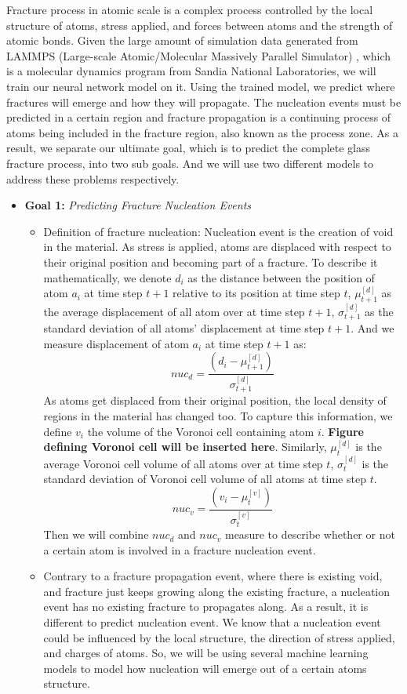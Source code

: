 
Fracture process in atomic scale is a complex process controlled by the local structure of atoms, stress applied, and forces between atoms and the strength of atomic bonds. 
Given the large amount of simulation data generated from LAMMPS (Large-scale Atomic/Molecular Massively Parallel Simulator) \cite{PAMD}, which is a molecular dynamics program from Sandia National Laboratories, we will train our neural network model on it. Using the trained model, we predict where fractures will emerge and how they will propagate. The nucleation events must be predicted in a certain region and fracture propagation is a continuing process of atoms being included in the fracture region, also known as the process zone. As a result, we separate our ultimate goal, which is to predict the complete glass fracture process, into two sub goals. And we will use two different models to address these problems respectively. 


\begin{itemize}
\item \textbf{Goal 1:} \emph{Predicting Fracture Nucleation Events} 
\begin{itemize} 
    \item Definition of fracture nucleation: Nucleation event is the creation of void in the material. As stress is applied, atoms are displaced with respect to their original position and becoming part of a fracture. To describe it mathematically, we denote $d_i$ as the distance between the position of atom $a_i$ at time step $t+1$ relative to its position at time step $t$, $\mu^{[d]}_{t+1}$ as the average displacement of all atom over at time step $t+1$, $\sigma^{[d]}_{t+1}$ as the standard deviation of all atoms' displacement at time step $t+1$. And we measure displacement of atom $a_i$ at time step $t+1$ as:
    \[
    nuc_d = \frac{(d_i - \mu^{[d]}_{t+1})}{\sigma^{[d]}_{t+1}}
    \]
    As atoms get displaced from their original position, the local density of regions in the material has changed too. To capture this information, we define $v_i$ the volume of the Voronoi cell containing atom $i$. \textbf{Figure defining Voronoi cell will be inserted here}. Similarly, $\mu^{[d]}_{t}$ is the average Voronoi cell volume of all atoms over at time step $t$, $\sigma^{[d]}_{t}$ is the standard deviation of Voronoi cell volume of all atoms at time step $t$. 
    \[
    nuc_v = \frac{(v_i - \mu^{[v]}_{t})}{\sigma^{[v]}_{t}}
    \]
    Then we will combine $nuc_d$ and $nuc_v$ measure to describe whether or not a certain atom is involved in a fracture nucleation event. 
    \item Contrary to a fracture propagation event, where there is existing void, and fracture just keeps growing along the existing fracture, a nucleation event has no existing fracture to propagates along. As a result, it is different to predict nucleation event. We know that a nucleation event could be influenced by the local structure, the direction of stress applied, and charges of atoms. So, we will be using several machine learning models to model how nucleation will emerge out of a certain atoms structure. 
\end{itemize}
\end{itemize}


